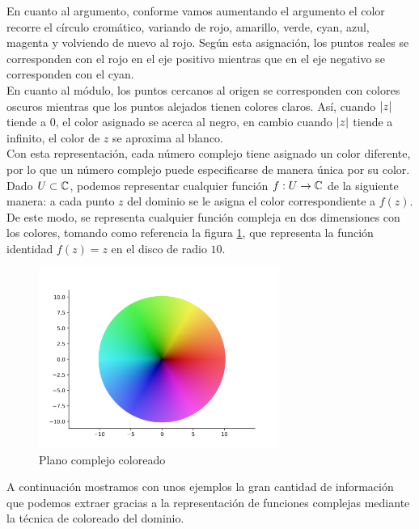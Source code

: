 En cuanto al argumento, conforme vamos aumentando el argumento el color recorre el círculo cromático, variando de rojo, amarillo, verde, cyan, azul, magenta y volviendo de nuevo al rojo. Según esta asignación, los puntos reales se corresponden con el rojo en el eje positivo mientras que en el eje negativo se corresponden con el cyan. \\

En cuanto al módulo, los puntos cercanos al origen se corresponden con colores oscuros mientras que los puntos alejados tienen colores claros. Así, cuando $\left\lvert z\right\rvert$ tiende a $0$, el color asignado se acerca al negro, en cambio cuando $\left\lvert z\right\rvert$ tiende a infinito, el color de $z$ se aproxima al blanco. \\

Con esta representación, cada número complejo tiene asignado un color diferente, por lo que un número complejo puede especificarse de manera única por su color. Dado $U \subset \mathbb{C}$, podemos representar cualquier función $f: U \to \mathbb{C}$ de la siguiente manera: a cada punto $z$ del dominio se le asigna el color correspondiente a $f(z)$. De este modo, se representa cualquier función compleja en dos dimensiones con los colores, tomando como referencia la figura \ref{fig:z}, que representa la función identidad $f(z) = z$ en el disco de radio $10$. \\

\begin{figure}[!htbp]
    \centering
    \includegraphics[width=0.7\textwidth]{../Aplicacion/z.png}
    \caption{Plano complejo coloreado}
    \label{fig:z}
\end{figure}

A continuación mostramos con unos ejemplos la gran cantidad de información que podemos extraer gracias a la representación de funciones complejas mediante la técnica de coloreado del dominio. \\

